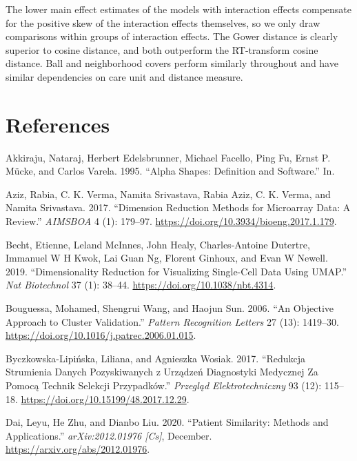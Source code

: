 \documentclass{article}
\newlength{\cslhangindent}
\newlength{\cslentryspacingunit} %
\newenvironment{CSLReferences}[2] %
 {%
  \setlength{\parindent}{0pt}
  \ifodd #1
  \let\oldpar\par
  \def\par{\hangindent=\cslhangindent\oldpar}
  \fi
  \setlength{\parskip}{#2\cslentryspacingunit}
 }%
 {}
\begin{document}
The lower main effect estimates of the models with interaction effects
compensate for the positive skew of the interaction effects themselves,
so we only draw comparisons within groups of interaction effects. The
Gower distance is clearly superior to cosine distance, and both
outperform the RT-transform cosine distance. Ball and neighborhood
covers perform similarly throughout and have similar dependencies on
care unit and distance measure.

\hypertarget{references}{%
\section*{References}\label{references}}

\hypertarget{refs}{}
\begin{CSLReferences}{1}{0}
\leavevmode{}%
Akkiraju, Nataraj, Herbert Edelsbrunner, Michael Facello, Ping Fu, Ernst
P. Mücke, and Carlos Varela. 1995. {``Alpha Shapes: Definition and
Software.''} In.

\leavevmode{}%
Aziz, Rabia, C. K. Verma, Namita Srivastava, Rabia Aziz, C. K. Verma,
and Namita Srivastava. 2017. {``Dimension Reduction Methods for
Microarray Data: A Review.''} \emph{AIMSBOA} 4 (1): 179--97.
\url{https://doi.org/10.3934/bioeng.2017.1.179}.

\leavevmode{}%
Becht, Etienne, Leland McInnes, John Healy, Charles-Antoine Dutertre,
Immanuel W H Kwok, Lai Guan Ng, Florent Ginhoux, and Evan W Newell.
2019. {``Dimensionality Reduction for Visualizing Single-Cell Data Using
{UMAP}.''} \emph{Nat Biotechnol} 37 (1): 38--44.
\url{https://doi.org/10.1038/nbt.4314}.

\leavevmode{}%
Bouguessa, Mohamed, Shengrui Wang, and Haojun Sun. 2006. {``An Objective
Approach to Cluster Validation.''} \emph{Pattern Recognition Letters} 27
(13): 1419--30. \url{https://doi.org/10.1016/j.patrec.2006.01.015}.

\leavevmode{}%
Byczkowska-Lipińska, Liliana, and Agnieszka Wosiak. 2017. {``Redukcja
Strumienia Danych Pozyskiwanych z Urządzeń Diagnostyki Medycznej Za
Pomocą Technik Selekcji Przypadków.''} \emph{Przegląd Elektrotechniczny}
93 (12): 115--18. \url{https://doi.org/10.15199/48.2017.12.29}.

\leavevmode{}%
Dai, Leyu, He Zhu, and Dianbo Liu. 2020. {``Patient Similarity: Methods
and Applications.''} \emph{arXiv:2012.01976 {[}Cs{]}}, December.
\url{https://arxiv.org/abs/2012.01976}.


\end{CSLReferences}
\end{document}
